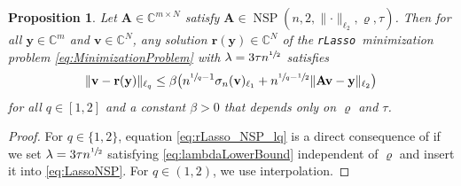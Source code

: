 \documentclass[11pt,reqno, a4paper]{article}
\numberwithin{equation}{section}
\newtheorem{prop}[theorem]{Proposition}
\newcommand{\rlasso}{\texttt{rLasso}}
\begin{document}
\begin{prop}\label{prop:rLasso_for_NSP} Let $\mathbf{A} \in \mathbb{C}^{m\times N}$ satisfy $\mathbf{A}\in\operatorname{NSP}(n,2,\lVert\cdot\rVert_{\ell_2},\varrho,\tau)$.
Then for all $\mathbf{y} \in \mathbb{C}^m$ and $\mathbf{v} \in \mathbb{C}^{N}$, any solution $\mathbf{r}(\mathbf{y}) \in \mathbb{C}^{N}$ of the \rlasso \ minimization problem \eqref{eq:MinimizationProblem} with $\lambda = 3\tau n^{\sfrac{1}{2}}$ satisfies
\begin{equation}\label{eq:rLasso_NSP_lq}
	\lVert\mathbf{v}- \mathbf{r}(\mathbf{y}) \rVert_{\ell_q} \leq \beta\bigl(n^{\sfrac{1}{q}-1}\sigma_n(\mathbf{v})_{\ell_1} + n^{\sfrac{1}{q}-\sfrac{1}{2}}  \lVert\mathbf{A}\mathbf{v}-\mathbf{y}\rVert_{\ell_2}\bigr)
\end{equation}
for all $q\in[1,2]$ and a constant $\beta>0$ that depends only on $\varrho$ and $\tau$.
\end{prop}

\begin{proof}
    For $q\in\{1,2\}$, equation \eqref{eq:rLasso_NSP_lq} is a direct consequence of  if we set $\lambda = 3\tau n^{\sfrac{1}{2}}$ satisfying \eqref{eq:lambdaLowerBound} independent of $\varrho$ and insert it into \eqref{eq:LassoNSP}.
    For $q\in(1,2)$, we use interpolation.
\end{proof}

\end{document}
